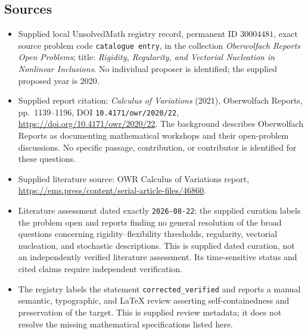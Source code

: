 \documentclass[11pt]{article}
\begin{document}
\subsection{Sources}
\begin{itemize}
\item Supplied local UnsolvedMath registry record, permanent ID \(30004481\), exact source problem code \texttt{catalogue entry}, in the collection \emph{Oberwolfach Reports Open Problems}; title: \emph{Rigidity, Regularity, and Vectorial Nucleation in Nonlinear Inclusions}. No individual proposer is identified; the supplied proposed year is 2020.
\item Supplied report citation: \emph{Calculus of Variations} (2021), Oberwolfach Reports, pp.\ 1139--1196, DOI \texttt{10.4171/owr/2020/22}, \url{https://doi.org/10.4171/owr/2020/22}. The background describes Oberwolfach Reports as documenting mathematical workshops and their open-problem discussions. No specific passage, contribution, or contributor is identified for these questions.
\item Supplied literature source: OWR Calculus of Variations report, \url{https://ems.press/content/serial-article-files/46860}.
\item Literature assessment dated exactly \texttt{2026-08-22}: the supplied curation labels the problem open and reports finding no general resolution of the broad questions concerning rigidity--flexibility thresholds, regularity, vectorial nucleation, and stochastic descriptions. This is supplied dated curation, not an independently verified literature assessment. Its time-sensitive status and cited claims require independent verification.
\item The registry labels the statement \texttt{corrected\_verified} and reports a manual semantic, typographic, and LaTeX review asserting self-containedness and preservation of the target. This is supplied review metadata; it does not resolve the missing mathematical specifications listed here.
\end{itemize}
\end{document}
